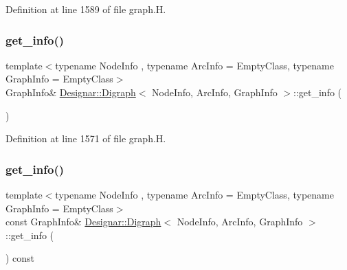 Definition at line 1589 of file graph.\+H.

\mbox{\label{class_designar_1_1_digraph_a530d2befede0eede246d9eed6c05f1f6}} 
\subsubsection{\texorpdfstring{get\+\_\+info()}{get\_info()}\hspace{0.1cm}{\footnotesize\ttfamily [1/2]}}
{\footnotesize\ttfamily template$<$typename Node\+Info , typename Arc\+Info  = Empty\+Class, typename Graph\+Info  = Empty\+Class$>$ \\
Graph\+Info\& \hyperlink{class_designar_1_1_digraph}{Designar\+::\+Digraph}$<$ Node\+Info, Arc\+Info, Graph\+Info $>$\+::get\+\_\+info (\begin{DoxyParamCaption}{ }\end{DoxyParamCaption})\hspace{0.3cm}{\ttfamily [inline]}}



Definition at line 1571 of file graph.\+H.

\mbox{\label{class_designar_1_1_digraph_a113a9f5a392795312a2d0c0d5c86041c}} 
\subsubsection{\texorpdfstring{get\+\_\+info()}{get\_info()}\hspace{0.1cm}{\footnotesize\ttfamily [2/2]}}
{\footnotesize\ttfamily template$<$typename Node\+Info , typename Arc\+Info  = Empty\+Class, typename Graph\+Info  = Empty\+Class$>$ \\
const Graph\+Info\& \hyperlink{class_designar_1_1_digraph}{Designar\+::\+Digraph}$<$ Node\+Info, Arc\+Info, Graph\+Info $>$\+::get\+\_\+info (\begin{DoxyParamCaption}{ }\end{DoxyParamCaption}) const\hspace{0.3cm}{\ttfamily [inline]}}



